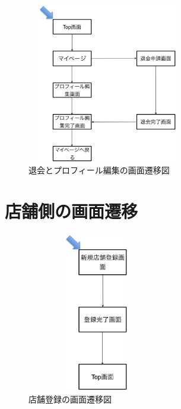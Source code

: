 \documentclass[a4j,titlepage]{jarticle}
\begin{document}
\begin {figure}[!htbp]
    \begin{center}
    \includegraphics [height=7cm, width=7cm]{tai.eps}
    \caption {退会とプロフィール編集の画面遷移図}
    \label {fig:tai}
    \end{center}
\end {figure}

\clearpage


\section{店舗側の画面遷移}

\begin {figure}[!htbp]
    \begin{center}
    \includegraphics [height=7cm, width=6cm]{tenpo.eps}
    \caption {店舗登録の画面遷移図}
    \label {fig:tenpo}
    \end{center}
\end {figure}
\end{document}
